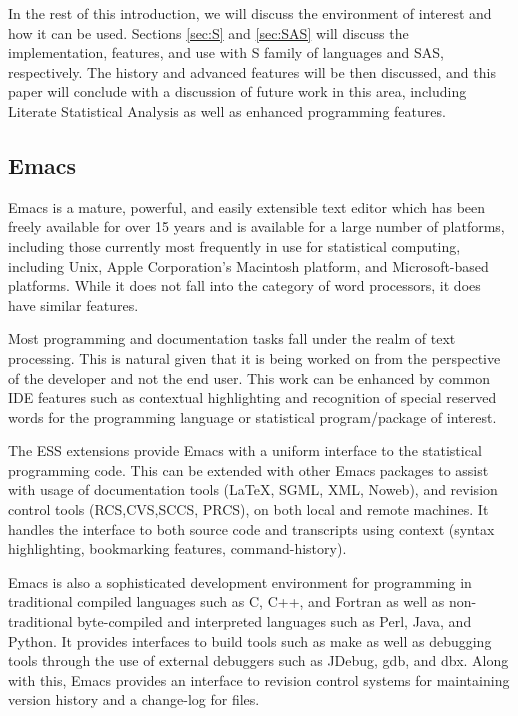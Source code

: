 \documentclass{article}
\begin{document}
In the rest of this introduction, we will discuss the environment of
interest and how it can be used.  Sections \ref{sec:S} and
\ref{sec:SAS} will discuss the implementation, features, and use with
S family of languages and SAS, respectively.  The history and advanced
features will be then discussed, and this paper will conclude with a
discussion of future work in this area, including Literate Statistical
Analysis as well as enhanced programming features.

\subsection{Emacs}
\label{sec:intro:emacs}

Emacs \citep{RMS:2000} is a mature, powerful, and easily extensible
text editor which has been freely available for over 15 years and is
available for a large number of platforms, including those currently
most frequently in use for statistical computing, including Unix,
Apple Corporation's Macintosh platform, and Microsoft-based platforms.
While it does not fall into the category of word processors, it does
have similar features.

Most programming and documentation tasks fall under the realm of text
processing.  This is natural given that it is being worked on from the
perspective of the developer and not the end user.  This work can be
enhanced by common IDE features such as contextual highlighting and
recognition of special reserved words for the programming language or
statistical program/package of interest.

The ESS extensions provide Emacs with a uniform interface to the
statistical programming code.  This can be extended with other Emacs
packages to assist with usage of documentation tools (\LaTeX, SGML,
XML, Noweb), and revision control tools (RCS,CVS,SCCS, PRCS), on both
local and remote machines.  It handles the interface to both source
code and transcripts using context (syntax highlighting, bookmarking
features, command-history).

Emacs is also a sophisticated development environment for programming
in traditional compiled languages such as C, C++, and Fortran as well
as non-traditional byte-compiled and interpreted languages such as
Perl, Java, and Python.  It provides interfaces to build tools such as
make as well as debugging tools through the use of external debuggers
such as JDebug, gdb, and dbx. Along with this, Emacs provides an
interface to revision control systems for maintaining version history
and a change-log for files.
\end{document}
